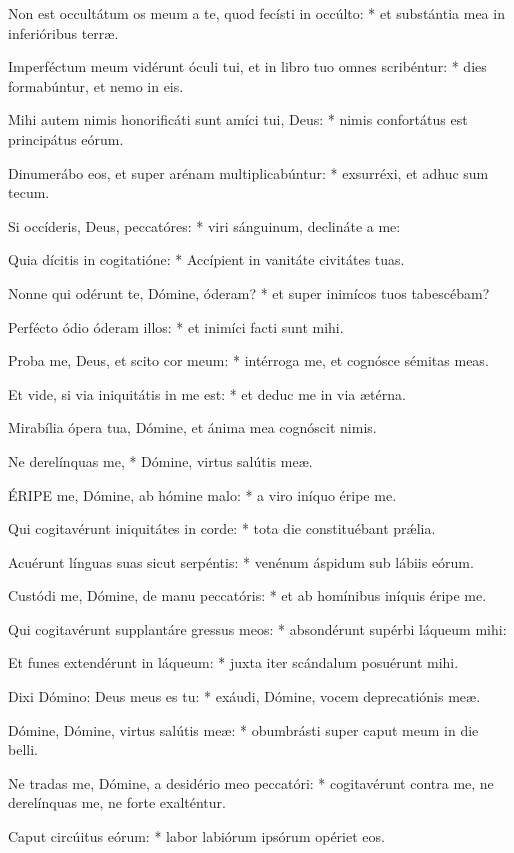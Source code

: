 Non est occultátum os meum a te, quod fecísti in occúlto: * et substántia mea in inferióribus terræ.

Imperféctum meum vidérunt óculi tui, et in libro tuo omnes scribéntur: * dies formabúntur, et nemo in eis.

Mihi autem nimis honorificáti sunt amíci tui, Deus: * nimis confortátus est principátus eórum.

Dinumerábo eos, et super arénam multiplicabúntur: * exsurréxi, et adhuc sum tecum.

Si occíderis, Deus, peccatóres: * viri sánguinum, declináte a me:

Quia dícitis in cogitatióne: * Accípient in vanitáte civitátes tuas.

Nonne qui odérunt te, Dómine, óderam? * et super inimícos tuos tabescébam?

Perfécto ódio óderam illos: * et inimíci facti sunt mihi.

Proba me, Deus, et scito cor meum: * intérroga me, et cognósce sémitas meas.

Et vide, si via iniquitátis in me est: * et deduc me in via ætérna.

 Mirabília ópera tua, Dómine, et ánima mea cognóscit nimis.

 Ne derelínquas me, * Dómine, virtus salútis meæ.


\lettrine[lines=2]{É}{RIPE} me, Dómine, ab hómine malo: * a viro iníquo éripe me.

Qui cogitavérunt iniquitátes in corde: * tota die constituébant prǽlia.

Acuérunt línguas suas sicut serpéntis: * venénum áspidum sub lábiis eórum.

Custódi me, Dómine, de manu peccatóris: * et ab homínibus iníquis éripe me.

Qui cogitavérunt supplantáre gressus meos: * absondérunt supérbi láqueum mihi:

Et funes extendérunt in láqueum: * juxta iter scándalum posuérunt mihi.

Dixi Dómino: Deus meus es tu: * exáudi, Dómine, vocem deprecatiónis meæ.

Dómine, Dómine, virtus salútis meæ: * obumbrásti super caput meum in die belli.

Ne tradas me, Dómine, a desidério meo peccatóri: * cogitavérunt contra me, ne derelínquas me, ne forte exalténtur.

Caput circúitus eórum: * labor labiórum ipsórum opériet eos.

